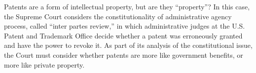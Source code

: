 Patents are a form of intellectual property, but are they ``property''? In this
case, the Supreme Court considers the constitutionality of administrative agency
process, called ``inter partes review,'' in which administrative judges at the
U.S. Patent and Trademark Office decide whether a patent was erroneously granted
and have the power to revoke it. As part of its analysis of the constitutional
issue, the Court must consider whether patents are more like
government benefits, or more like private property.


